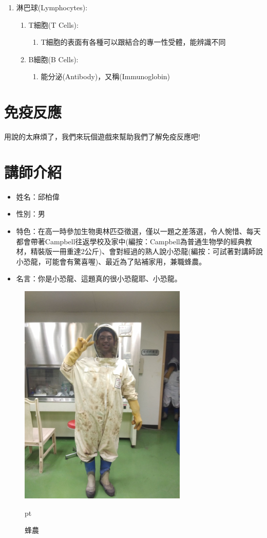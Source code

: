 \begin{enumerate}
\begin{enumerate}
\begin{enumerate}
		\end{enumerate}
	\end{enumerate}
\item 淋巴球(Lymphocytes):
	\begin{enumerate}
	\item T細胞(T Cells):
		\begin{enumerate}
		\item T細胞的表面有各種可以跟\underline{\hspace{2cm}}結合的專一性受體，能辨識不同
		\end{enumerate}
	\item B細胞(B Cells):
		\begin{enumerate}
		\item 能分泌\underline{\hspace{2cm}}(Antibody)，又稱\underline{\hspace{2cm}}(Immunoglobin)
		\end{enumerate}
	\end{enumerate}

\end{enumerate}
\section{免疫反應}
用說的太麻煩了，我們來玩個遊戲來幫助我們了解免疫反應吧!

\section{講師介紹}
\begin{itemize}
\item 姓名：邱柏偉
\item 性別：男
\item 特色：在高一時參加生物奧林匹亞徵選，僅以一題之差落選，令人惋惜、每天都會帶著Campbell往返學校及家中(編按：Campbell為普通生物學的經典教材，精裝版一冊重達2公斤)、會對經過的熟人說小恐龍(編按：可試著對講師說小恐龍，可能會有驚喜喔)、最近為了貼補家用，兼職蜂農。
\item 名言：你是小恐龍、這題真的很小恐龍耶、小恐龍。
\end{itemize}

\begin{figure}[H]
\graphicspath{{biology/}}
\includegraphics[width=8cm, center]{farmer.jpg}
\caption{蜂農}  pt
\label{fig:farmer}
\end{figure}